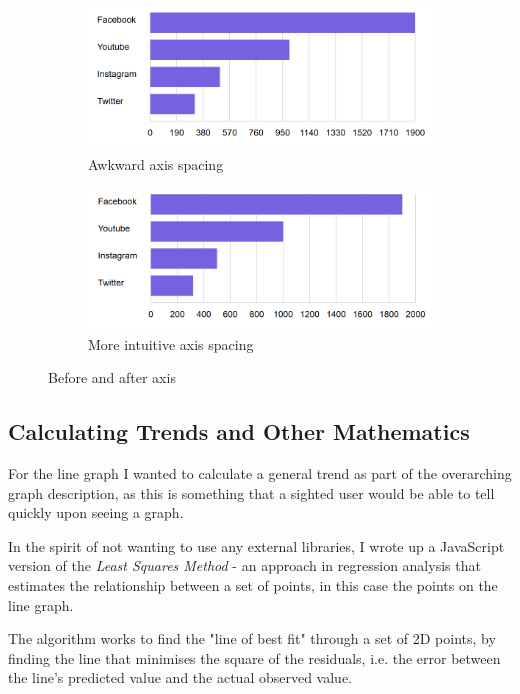 \documentclass[ %
                    author={Aleena Baig},
                supervisor={Dr Simon Lock},
                    degree={BSc},
                     title={On Making Web Accessible Graphs},
                  subtitle={},
                      year={2019} ]{dissertation}
\begin{document}
\begin{figure}[h]
  \centering
  \begin{subfigure}[b]{0.4\linewidth}
    \includegraphics[width=\linewidth]{images/awkwardAxis.PNG}
     \caption{Awkward axis spacing}
  \end{subfigure}
  \begin{subfigure}[b]{0.4\linewidth}
    \includegraphics[width=\linewidth]{images/lessAwkwardAxis.PNG}
    \caption{More intuitive axis spacing}
  \end{subfigure}
  \caption{Before and after axis}
  \label{Awkwardsaxis}
\end{figure}

\subsection{Calculating Trends and Other Mathematics}

For the line graph I wanted to calculate a general trend as part of the overarching graph description, as this is something that a sighted user would be able to tell quickly upon seeing a graph.

In the spirit of not wanting to use any external libraries, I wrote up a JavaScript version of the \textit{Least Squares Method} -  an approach in regression analysis that estimates the relationship between a set of points, in this case the points on the line graph.

The algorithm works to find the "line of best fit" through a set of 2D points, by finding the line that minimises the square of the residuals, i.e. the error between the line's predicted value and the actual observed value.
\end{document}
